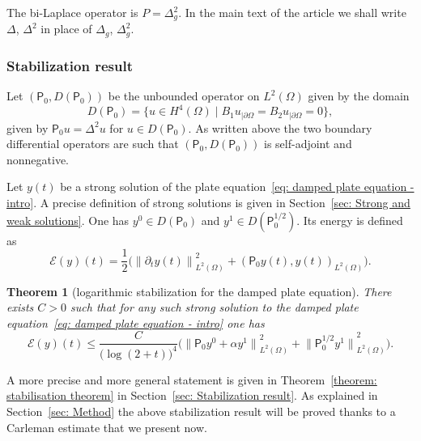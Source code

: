 \documentclass[JEP,XML,SOM,Unicode,published]{cedram}
\let\sep\mid
\theoremstyle{plain}
\newtheorem{theorem}{Theorem}[section]
\theoremstyle{definition}
\newcommand{\inp}[2]{(#1, #2)}
\newcommand{\E}{\ensuremath{\mathcal E}}
\newcommand{\Norm}[2]{{\| #1 \|}_{#2}}
\newcommand{\Pell}{\mathsf P_0}
\begin{document}
The bi-Laplace operator is $P= \Delta^2_g$. In the main text of the
article we shall write $\Delta$, $\Delta^2$ in place of $\Delta_g$, $\Delta_g^2$.

\subsubsection{Stabilization result}

Let $(\Pell, D(\Pell))$ be the unbounded operator on $L^2(\Omega)$ given by the domain
\begin{equation}
\label{eq: domain P intro}
D(\Pell) = \big\{ u \in H^4(\Omega)\sep B_1
u_{|\partial \Omega}
= B_2 u_{|\partial \Omega}=0\big\},
\end{equation}
given by $\Pell u = \Delta^2 u$ for $u \in D(\Pell)$. As written above
the two boundary differential operators are such that $(\Pell, D(\Pell))$
is self-adjoint and nonnegative.

Let $y(t)$ be a strong solution of the plate equation~\eqref{eq:
damped plate equation - intro}. A precise definition of strong
solutions is given in Section~\ref{sec: Strong and weak
solutions}. One has $y^0 \in D(\Pell)$ and
$y^1 \in D(\Pell^{1/2})$. Its energy is defined as
\begin{equation*}
\E(y) (t) = \frac12 \big(\Norm{\partial_t y (t)}{L^2(\Omega)}^2
+ \inp{\Pell y (t)}{y (t)}_{L^2(\Omega)}
\big).
\end{equation*}

\begin{theorem}[logarithmic stabilization for the damped plate equation]
\label{theorem: stabilisation theorem-intro}
There exists $C>0$ such that for any such strong solution to the
damped plate equation~\eqref{eq: damped plate equation - intro} one
has
\begin{equation*}
\E(y)(t) \leq \frac{C}{\big(\log(2+t)\big)^{4}}
\big(\Norm{\Pell y^0+ \alpha y^1}{L^2(\Omega)}^2
+ \Norm{\Pell^{1/2} y^1}{L^2(\Omega)}^2
\big).
\end{equation*}
\end{theorem}
A more precise and more general statement is given in Theorem~\ref{theorem:
stabilisation theorem} in Section~\ref{sec: Stabilization result}.
As explained in Section~\ref{sec: Method} the above stabilization
result will be proved thanks to a Carleman estimate that we present now.
\end{document}
